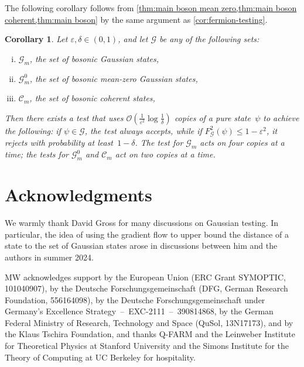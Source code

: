 \documentclass[11pt,a4paper]{article}
\newtheorem{corollary}[theorem]{Corollary}\AddToHook{env/corollary/begin}{\crefalias{theorem}{corollary}}
\numberwithin{equation}{section}
\newcommand{\eps}{\varepsilon}
\newcommand{\bigO}{\mathcal O}
\newcommand{\GG}{\mathcal G}
\newcommand{\1}{\mathbf{1}}
\begin{document}
The following corollary follows from \cref{thm:main boson mean zero,thm:main boson coherent,thm:main boson} by the same argument as \cref{cor:fermion-testing}.

\begin{corollary}\label{cor:boson-testing}
Let $\eps,\delta\in(0,1)$, and let $\GG$ be any of the following sets:
\begin{enumerate}[(i),itemsep=0pt]
    \item $\GG_m$, the set of bosonic Gaussian states,
    \item $\GG_m^0$, the set of bosonic mean-zero Gaussian states,
    \item $\mathcal C_m$, the set of bosonic coherent states,
\end{enumerate}
Then there exists a test that uses $\bigO(\frac1{\eps^2} \log \frac1\delta)$ copies of a pure state~$\psi$ to achieve the following:
if $\psi \in \GG$, the test always accepts, while if $F^2_{\GG}(\psi) \leq 1-\eps^2$, it rejects with probability at least~$1-\delta$.
The test for $\GG_m$ acts on four copies at a time; the tests for $\GG_m^0$ and $\mathcal C_m$ act on two copies at a time.
\end{corollary}

\section*{Acknowledgments}
We warmly thank David Gross for many discussions on Gaussian testing.
In particular, the idea of using the gradient flow to upper bound the distance of a state to the set of Gaussian states arose in discussions between him and the authors in summer 2024.

MW acknowledges support by the European Union (ERC Grant SYMOPTIC, 101040907), by the Deutsche Forschungsgemeinschaft (DFG, German Research Foundation, 556164098), by the Deutsche Forschungsgemeinschaft under Germany's Excellence Strategy~--~EXC-2111~--~390814868, by the German Federal Ministry of Research, Technology and Space (QuSol, 13N17173), and by the Klaus Tschira Foundation, and thanks Q-FARM and the Leinweber Institute for Theoretical Physics at Stanford University and the Simons Institute for the Theory of Computing at UC Berkeley for hospitality.

\end{document}
